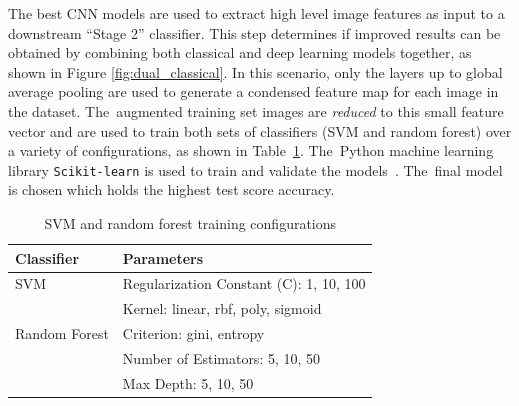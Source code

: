 The best \ac{CNN} models are used to extract high level image features as input to a downstream ``Stage    2'' classifier.  This step determines if improved results can be obtained by combining both classical and deep learning models together, as shown in Figure \ref{fig:dual_classical}.  In this scenario, only the layers up to global average pooling are used to generate a condensed feature map for each image in the dataset.  The~augmented training set images are \emph{reduced} to this small feature vector and are used to train both sets of classifiers (SVM and random forest) over a variety of configurations, as shown in Table~\ref{table:classic_params}. The~Python machine learning library \texttt{Scikit-learn} is used to train and validate the models~\cite{pedregosa_scikit-learn_2011}. The~final model is chosen which holds the highest test score accuracy.


\begin{table}[H]
\caption{SVM and random forest training configurations}\label{table:classic_params}
\centering
\begin{tabular}{@{}ll@{}}
\toprule
\textbf{Classifier}     & \textbf{Parameters }                     \\ \midrule
SVM            & Regularization Constant (C): 1, 10, 100                     \\
              & Kernel: linear, rbf, poly, sigmoid \\
              \midrule
Random Forest  & Criterion: gini, entropy        \\
              & Number of Estimators: 5, 10, 50         \\
              & Max Depth: 5, 10, 50              \\ \bottomrule
\end{tabular}
\end{table}
\unskip


